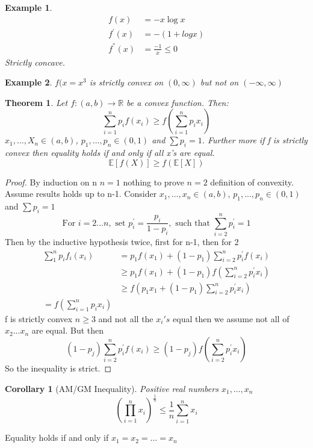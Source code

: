 \documentclass{notes}
\theoremstyle{plain}
\newtheorem{theorem}{Theorem}[chapter]
\newtheorem*{example}{Example}
\newtheorem*{corollary}{Corollary}
\newcommand{\bR}{\mathbb{R}}
\newcommand{\bE}{\mathbb{E}}
\newcommand{\expect}[1]{\bE\!\left[#1\right]}
\begin{document}
\begin{example}
\begin{align*}
f(x) &= - x\log x\\
f^{'}(x) &= -(1 + logx)\\
f^{''}(x) &= \frac{-1}{x} \le 0
\end{align*}
Strictly concave.
\end{example}
\begin{example}
$f(x =x^3$ is strictly convex on $(0,\infty)$ but not on $(-\infty, \infty)$
\end{example}
\begin{theorem}
Let $f:(a,b) \to \bR$ be a convex function.  Then:
\[
\sum_{i=1}^n p_i f(x_i) \geq f\left( \sum_{i=1}^n  p_i x_i\right)
\]
$x_1,\dots,X_n \in (a,b)$, $p_1,\dots,p_n \in (0,1)$ and $\sum p_i = 1$.  Further 
more if f is strictly convex then equality holds if and only if all x's are 
equal.
\[
\expect{f(X)} \geq f(\expect{X})
\]
\end{theorem}
\begin{proof} By induction on n $n=1$ nothing to prove $n=2$ definition of convexity.  Assume results holds up to n-1. Consider
$x_1,...,x_n \in (a,b)$, $p_1,...,p_n \in (0,1)$ and $\sum p_i = 1$
\[
\text{For } i=2...n,\text{ set } p_{i}^{'} = \frac{p_i}{1-p_i}, \text{ such that }
\sum_{i=2}^n p_{i}^{'} =1
\]
Then by the inductive hypothesis twice, first for n-1, then for 2
\begin{align*}
\sum_1^n p_i f_i(x_i) &= p_1f(x_1) + (1-p_1)\sum_{i=2}^n p_{i}^{'}f(x_i)\\
&\geq  p_1f(x_1) + (1-p_1)f\left( \sum_{i=2}^n p_{i}^{'}x_i\right)\\
&\geq f \left(p_1x_1 + (1-p_1)\sum_{i=2}^n p_{i}^{'}x_i \right)\\
= f\left( \sum_{i=1}^n p_ix_i \right)
\end{align*}
f is strictly convex $n\geq 3$ and not all the $x_i's$ equal then we assume
not all of $x_2...x_n$ are equal.  But then
\[
(1-p_j)\sum_{i=2}^n p_{i}^{'}f(x_i) \ge (1-p_j)f\left(\sum_{i=2}^n p_{i}^{'}x_i \right)
\]
So the inequality is strict.
\end{proof}
\begin{corollary}[AM/GM Inequality]
Positive real numbers $ x_1,\dots,x_n$
\[
\left(\prod_{i=1}^n x_i\right)^{\frac{1}{n}} \leq \frac{1}{n} \sum_{i=1}^n x_i
\]
\end{corollary}
Equality holds if and only if $x_1=x_2=\dots=x_n$
\end{document}
